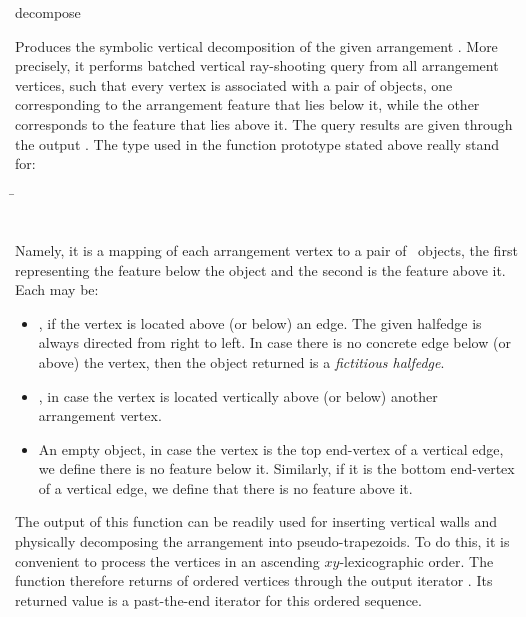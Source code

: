\ccRefPageBegin

\begin{ccRefFunction}{decompose}

\ccDefinition

Produces the symbolic vertical decomposition of the given arrangement
. More precisely, it performs batched vertical ray-shooting
query from all arrangement vertices, such that every vertex is associated
with a pair of objects, one corresponding to the arrangement feature that
lies below it, while the other corresponds to the feature that lies above
it. The query results are given through the output . The
type  used in the function prototype stated above really
stand for: \\
\begin{tabbing}
\=\\
                 ~   \>
\end{tabbing}
Namely, it is a mapping of each arrangement vertex to a pair of \cgal\
objects, the first representing the feature below the object and the second
is the feature above it. Each \ccc{Object} may be: \\
\begin{itemize}
\item {}, if the vertex is located above (or below)
  an edge. The given halfedge is always directed from right to left.
  In case there is no concrete edge below (or above) the vertex, then
  the object returned is a {\em fictitious halfedge}.
\item {}, in case the vertex is located vertically
  above (or below) another arrangement vertex.
\item An empty object, in case the vertex is the top end-vertex of
  a vertical edge, we define there is no feature below it. Similarly, if
  it is the bottom end-vertex of a vertical edge, we define that there
  is no feature above it.
\end{itemize}
The output of this function can be readily used for inserting vertical walls
and physically decomposing the arrangement into pseudo-trapezoids. To do
this, it is convenient to process the vertices in an ascending
$xy$-lexicographic order. The function therefore returns of ordered vertices
through the output iterator \ccc{voi}. Its returned value is a past-the-end
iterator for this ordered sequence.




\end{ccRefFunction}

\ccRefPageEnd
